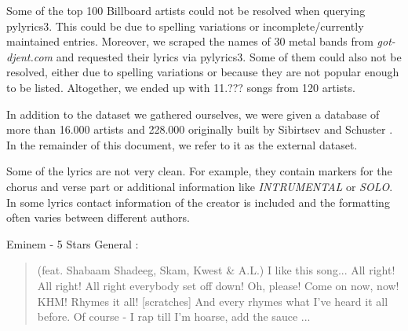 \documentclass[10pt,a4paper]{article}
\begin{document}
	Some of the top 100 Billboard artists could not be resolved when querying pylyrics3. This could be due to spelling variations or incomplete/currently maintained entries. Moreover, we scraped the names of 30 metal bands from \textit{got-djent.com} and requested their lyrics via pylyrics3. Some of them could also not be resolved, either due to spelling variations or because they are not popular enough to be listed. Altogether, we ended up with 11.??? songs from 120 artists.

	In addition to the dataset we gathered ourselves, we were given a database of more than 16.000 artists and 228.000 originally built by Sibirtsev and Schuster \cite{sibirtsevschuster}. In the remainder of this document, we refer to it as the external dataset.
	
	Some of the lyrics are not very clean. For example, they contain markers for the chorus and verse part or additional information like \textit{INTRUMENTAL} or \textit{SOLO}. In some lyrics contact information of the creator is included and the formatting often varies between different authors.
	
	Eminem - 5 Stars General :
	\begin{quote}
		(feat. Shabaam Shadeeg, Skam, Kwest \& A.L.) \newline
		[Intro:]  \newline
		[man 1:] I like this song...  \newline
		[man 2:] All right! All right! All right everybody set off down!  \newline
		[man 1:] Oh, please!  \newline
		[man 2:] Come on now, now! KHM!    \newline
		Rhymes it all! [scratches]  \newline
		And every rhymes what I've heard it all before.    \newline
		Of course - I rap till I'm hoarse, add the sauce  \newline
		...  
	\end{quote}
\end{document}
